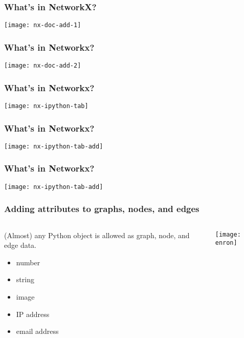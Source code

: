 \documentclass[xcolor=dvipsnames, 9pt]{beamer}
\begin{document}
\begin{frame}
\frametitle{What's in NetworkX?}
\centerline{\texttt{[image: nx-doc-add-1]}}
\end{frame}

\begin{frame}
\frametitle{What's in Networkx?}
\centerline{\texttt{[image: nx-doc-add-2]}}
\end{frame}

\begin{frame}
\frametitle{What's in Networkx?}
\centerline{\texttt{[image: nx-ipython-tab]}}
\end{frame}

\begin{frame}
\frametitle{What's in Networkx?}
\centerline{\texttt{[image: nx-ipython-tab-add]}}
\end{frame}


\begin{frame}
\frametitle{What's in Networkx?}
\centerline{\texttt{[image: nx-ipython-tab-add]}}
\end{frame}


\begin{frame}[fragile]
\frametitle{Adding attributes to graphs, nodes, and edges}

\begin{columns}
\begin{column}{0.3\textwidth}

(Almost) any Python object is allowed as graph, node, and edge data. 
\begin{itemize}
\item number
\item string
\item image
\item IP address
\item email address
\end{itemize}
\end{column}

\begin{column}{0.7\textwidth}
\centerline{\texttt{[image: enron]}}
\end{column}

\end{columns}


\end{frame}
\end{document}
